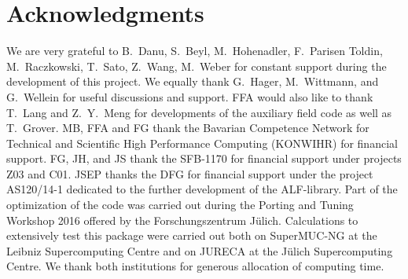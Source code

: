 

\section*{Acknowledgments} 

%

We are very grateful to  B.~Danu, S.~Beyl, M.~Hohenadler,  F.~Parisen Toldin,  M.~Raczkowski, T.~Sato, Z.~Wang,  M.~Weber   for constant support during the development of this project.
We equally thank G.~Hager, M.~Wittmann, and G.~Wellein for useful discussions and support.
FFA would also like to thank T.~Lang   and Z.~Y.~Meng for  developments of the auxiliary field code as well as T.~Grover. 
MB, FFA  and FG thank  the Bavarian Competence Network for Technical and Scientific High Performance Computing (KONWIHR) for financial support. FG, JH, and JS thank the SFB-1170 for  financial support under projects Z03 and C01.   JSEP  thanks the DFG for financial support under the project AS120/14-1 dedicated to the further development of the ALF-library.
Part of the optimization of the code was carried out during  the  Porting and Tuning Workshop 2016 offered by the Forschungszentrum J\"ulich.
Calculations  to extensively test this package were carried out both on  SuperMUC-NG at the  Leibniz Supercomputing Centre and on  JURECA  \cite{Jureca16} at the J\"ulich Supercomputing Centre.  We thank both institutions for generous allocation of computing time.
